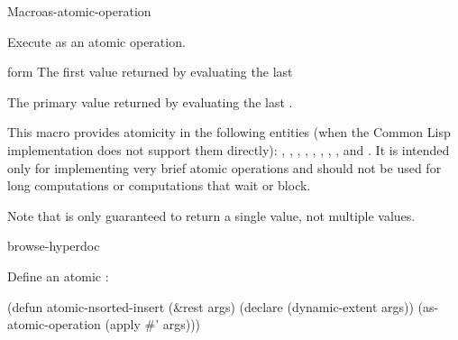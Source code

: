 \begin{functiondoc}{Macro}{as-atomic-operation}%
  {\superstar{} 
    \returns{} }

\fnsyntax

\fnpurpose Execute  as an atomic operation.

\fnpackage {}

\fnmodule {}

\fnargs
\begin{args}{form}
 The first value returned by evaluating the last 
\end{args}

\fnreturns The primary value returned by evaluating the last
.

\fndescription This macro provides atomicity in the following entities (when
the Common Lisp implementation does not support them directly):
%
,
,
,
, 
,
,
,
, and
.  
%
It is intended only for implementing very brief atomic operations and should
not be used for long computations or computations that wait or block.

Note that  is only guaranteed to return a
single value, not multiple values.

\begin{alsos}{browse-hyperdoc}
\end{alsos}

\fnexample
Define an atomic :
%
\W\supp
\begin{example}
  (defun atomic-nsorted-insert (\&rest args)
    (declare (dynamic-extent args))
    (as-atomic-operation (apply #' args)))
\end{example}

\end{functiondoc}


